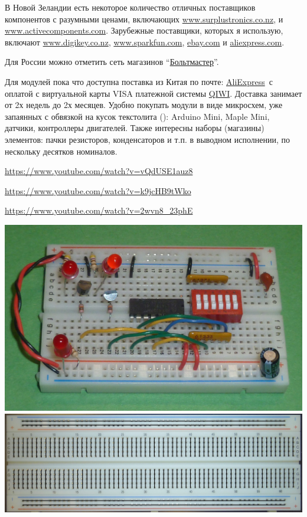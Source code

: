 
\label{bcentry}\secdown


В Новой Зеландии есть некоторое количество отличных поставщиков компонентов с
разумными ценами, включающих \url{www.surplustronics.co.nz}, и
\url{www.activecomponents.com}. Зарубежные поставщики, которых я использую,
включают \url{www.digikey.co.nz}, \url{www.sparkfun.com}, \url{ebay.com}
и \url{aliexpress.com}.

\bigskip
Для России можно отметить сеть магазинов
``\href{http://voltmaster.ru/}{Больтмастер}''.

\bigskip
Для модулей пока что доступна поставка из Китая по почте:
\href{http://www.aliexpress.com/}{AliExpress}\ с оплатой с виртуальной карты
VISA платежной системы \href{https://qiwi.ru/}{QIWI}. Доставка занимает от 2х
недель до 2х месяцев. Удобно покупать модули в виде микросхем, уже запаянных с
обвязкой на кусок текстолита (): Arduino Mini, Maple Mini,
датчики, контроллеры двигателей. Также интересны наборы (магазины) элементов:
пачки резисторов, конденсаторов и т.п. в выводном исполнении, по нескольку
десятков номиналов.


\begin{youtube}
\url{https://www.youtube.com/watch?v=vQdUSE1auz8}

\url{https://www.youtube.com/watch?v=k9jcHB9tWko}

\url{https://www.youtube.com/watch?v=2wvn8_23phE}

\end{youtube}

\bigskip
\noindent
\includegraphics[height=0.3\textheight]{bcollis/breadboard2.jpg}
\includegraphics[height=0.3\textheight]{bcollis/BreadboardConnections.jpg}
\bigskip

